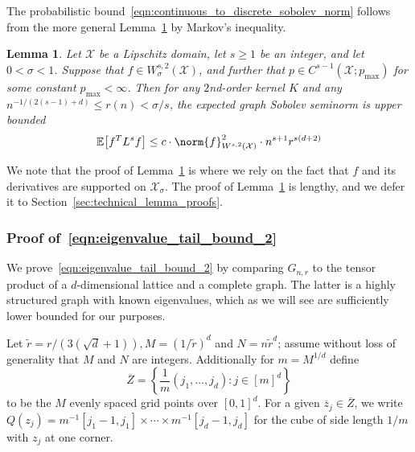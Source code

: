 \documentclass{article}
\newcommand{\set}[1]{\left\{#1\right\}}
\newcommand{\1}{\mathbf{1}}
\newcommand{\Xset}{\mathcal{X}}
\newcommand{\Ebb}{\mathbb{E}}
\newcommand{\wt}[1]{\widetilde{#1}}
\theoremstyle{alden}
\theoremstyle{aldenthm}
\newtheorem{lemma}{Lemma}
\theoremstyle{definition}
\theoremstyle{remark}
\begin{document}
The probabilistic bound~\eqref{eqn:continuous_to_discrete_sobolev_norm} follows from the more general Lemma~\ref{lem:roughness_functional_expectation_sobolev} by Markov's inequality. 
\begin{lemma}
	\label{lem:roughness_functional_expectation_sobolev}
	Let $\Xset$ be a Lipschitz domain, let $s \geq 1$ be an integer, and let $0 < \sigma < 1$. Suppose that $f \in W_{\sigma}^{s,2}(\Xset)$, and further that $p \in C^{s-1}(\Xset;p_{\max})$ for some constant $p_{\max} < \infty$. Then for any $2$nd-order kernel $K$ and any $n^{-1/(2(s - 1) + d)} \leq r(n) < \sigma/s$, the expected graph Sobolev seminorm is upper bounded
	\begin{equation}
	\label{eqn:roughness_functional_expectation_sobolev}
	\Ebb\bigl[f^T L^s f\bigr] \leq c \cdot \norm{f}_{W^{s,2}(\Xset)}^2 \cdot n^{s + 1}r^{s(d + 2)}
	\end{equation}
\end{lemma}

We note that the proof of Lemma~\ref{lem:roughness_functional_expectation_sobolev} is where we rely on the fact that $f$ and its derivatives are supported on $\Xset_{\sigma}$. The proof of Lemma~\ref{lem:roughness_functional_expectation_sobolev} is lengthy, and we defer it to Section~\ref{sec:technical_lemma_proofs}.

\subsubsection{Proof of~\eqref{eqn:eigenvalue_tail_bound_2}}

We prove~\eqref{eqn:eigenvalue_tail_bound_2} by comparing $G_{n,r}$ to the tensor product of a $d$-dimensional lattice and a complete graph. The latter is a highly structured graph with known eigenvalues, which as we will see are sufficiently lower bounded for our purposes.

Let $\wt{r} = r/(3(\sqrt{d} + 1)), M = (1/\wt{r})^d$ and $N = n\wt{r}^d$; assume without loss of generality that $M$ and $N$ are integers. Additionally for $m = M^{1/d}$ define
\begin{equation*}
\overline{Z} = \set{\frac{1}{m}(j_1,\ldots,j_d): j \in [m]^d}
\end{equation*}
to be the $M$ evenly spaced grid points over $[0,1]^d$.
For a given $\overline{z}_j \in \overline{Z}$, we write $Q(z_j) = m^{-1}[j_1 - 1,j_1] \times \cdots \times m^{-1}[j_d - 1,j_d]$ for the cube of side length $1/m$ with $z_j$ at one corner. 
\end{document}
